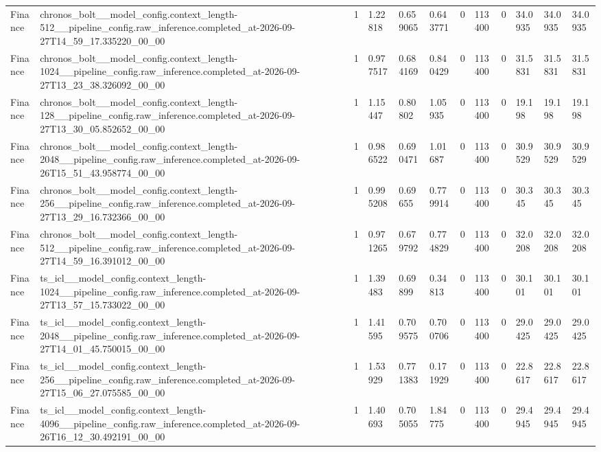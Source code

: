 \begin{tabular}{llllllllllll}
Finance & chronos\_bolt\_\_model\_config.context\_length-512\_\_pipeline\_config.raw\_inference.completed\_at-2026-09-27T14\_59\_17.335220\_00\_00 & 1 & 1.22818 & 0.659065 & 0.643771 & 0 & 113400 & 0 & 34.0935 & 34.0935 & 34.0935 \\
Finance & chronos\_bolt\_\_model\_config.context\_length-1024\_\_pipeline\_config.raw\_inference.completed\_at-2026-09-27T13\_23\_38.326092\_00\_00 & 1 & 0.977517 & 0.684169 & 0.840429 & 0 & 113400 & 0 & 31.5831 & 31.5831 & 31.5831 \\
Finance & chronos\_bolt\_\_model\_config.context\_length-128\_\_pipeline\_config.raw\_inference.completed\_at-2026-09-27T13\_30\_05.852652\_00\_00 & 1 & 1.15447 & 0.80802 & 1.05935 & 0 & 113400 & 0 & 19.198 & 19.198 & 19.198 \\
Finance & chronos\_bolt\_\_model\_config.context\_length-2048\_\_pipeline\_config.raw\_inference.completed\_at-2026-09-26T15\_51\_43.958774\_00\_00 & 1 & 0.986522 & 0.690471 & 1.01687 & 0 & 113400 & 0 & 30.9529 & 30.9529 & 30.9529 \\
Finance & chronos\_bolt\_\_model\_config.context\_length-256\_\_pipeline\_config.raw\_inference.completed\_at-2026-09-27T13\_29\_16.732366\_00\_00 & 1 & 0.995208 & 0.69655 & 0.779914 & 0 & 113400 & 0 & 30.345 & 30.345 & 30.345 \\
Finance & chronos\_bolt\_\_model\_config.context\_length-512\_\_pipeline\_config.raw\_inference.completed\_at-2026-09-27T14\_59\_16.391012\_00\_00 & 1 & 0.971265 & 0.679792 & 0.774829 & 0 & 113400 & 0 & 32.0208 & 32.0208 & 32.0208 \\
Finance & ts\_icl\_\_model\_config.context\_length-1024\_\_pipeline\_config.raw\_inference.completed\_at-2026-09-27T13\_57\_15.733022\_00\_00 & 1 & 1.39483 & 0.69899 & 0.34813 & 0 & 113400 & 0 & 30.101 & 30.101 & 30.101 \\
Finance & ts\_icl\_\_model\_config.context\_length-2048\_\_pipeline\_config.raw\_inference.completed\_at-2026-09-27T14\_01\_45.750015\_00\_00 & 1 & 1.41595 & 0.709575 & 0.700706 & 0 & 113400 & 0 & 29.0425 & 29.0425 & 29.0425 \\
Finance & ts\_icl\_\_model\_config.context\_length-256\_\_pipeline\_config.raw\_inference.completed\_at-2026-09-27T15\_06\_27.075585\_00\_00 & 1 & 1.53929 & 0.771383 & 0.171929 & 0 & 113400 & 0 & 22.8617 & 22.8617 & 22.8617 \\
Finance & ts\_icl\_\_model\_config.context\_length-4096\_\_pipeline\_config.raw\_inference.completed\_at-2026-09-26T16\_12\_30.492191\_00\_00 & 1 & 1.40693 & 0.705055 & 1.84775 & 0 & 113400 & 0 & 29.4945 & 29.4945 & 29.4945 \\

\end{tabular}
